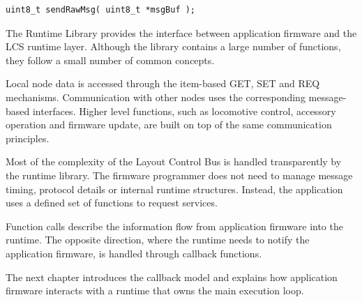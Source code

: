 \begin{lstlisting}[style=api-interface]
uint8_t sendRawMsg( uint8_t *msgBuf );
\end{lstlisting}


The Runtime Library provides the interface between application firmware and the LCS
runtime layer. Although the library contains a large number of functions, they follow a
small number of common concepts.

Local node data is accessed through the item-based GET, SET and REQ mechanisms.
Communication with other nodes uses the corresponding message-based interfaces. Higher
level functions, such as locomotive control, accessory operation and firmware update,
are built on top of the same communication principles.

Most of the complexity of the Layout Control Bus is handled transparently by the runtime
library. The firmware programmer does not need to manage message timing, protocol
details or internal runtime structures. Instead, the application uses a defined set of
functions to request services.

Function calls describe the information flow from application firmware into the runtime.
The opposite direction, where the runtime needs to notify the application firmware,
is handled through callback functions.

The next chapter introduces the callback model and explains how application firmware
interacts with a runtime that owns the main execution loop.